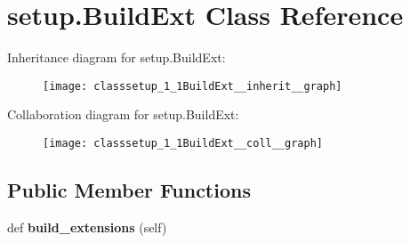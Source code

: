 \hypertarget{classsetup_1_1BuildExt}{}\section{setup.\+Build\+Ext Class Reference}
\label{classsetup_1_1BuildExt}


Inheritance diagram for setup.\+Build\+Ext\+:\nopagebreak
\begin{figure}[H]
\begin{center}
\leavevmode
\texttt{[image: classsetup\_1\_1BuildExt\_\_inherit\_\_graph]}
\end{center}
\end{figure}


Collaboration diagram for setup.\+Build\+Ext\+:\nopagebreak
\begin{figure}[H]
\begin{center}
\leavevmode
\texttt{[image: classsetup\_1\_1BuildExt\_\_coll\_\_graph]}
\end{center}
\end{figure}
\subsection*{Public Member Functions}
\begin{DoxyCompactItemize}
\item 
\mbox{\label{classsetup_1_1BuildExt_ae5dd612ab8d9a1acb6e965f899021be5}} 
def {\bfseries build\+\_\+extensions} (self)
\end{DoxyCompactItemize}
